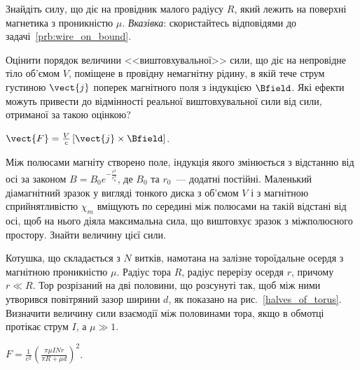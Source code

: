 \begin{problem}
    Знайдіть силу, що діє на провідник малого радіусу $R$, який лежить на поверхні магнетика з проникністю $\mu$. \emph{Вказівка}: скористайтесь відповідями до задачі~\ref{prb:wire_on_bound}.
\end{problem}

\begin{problem}
    Оцінити порядок величини <<виштовхувальної>> сили, що діє на непровідне тіло об'ємом $V$, поміщене в провідну немагнітну рідину, в якій тече струм густиною $\vect{j}$ поперек магнітного поля з індукцією $\Bfield$. Які ефекти можуть привести до відмінності реальної виштовхувальної сили від сили, отриманої за такою оцінкою?
\begin{solution}
	$\vect{F} = \frac{V}{c} \left[ \vect{j}\times\Bfield\right] $.
\end{solution}
\end{problem}

\begin{problem}
    Між полюсами магніту створено поле, індукція якого змінюється з відстанню від осі за законом  $B=B_0e^{-\frac{r^3}{r_0^3}}$, де $B_0$ та $r_0$~--- додатні постійні. Маленький діамагнітний зразок у вигляді тонкого диска з об'ємом $V$ і з магнітною сприйнятливістю $\chi_m$ вміщують по середині між полюсами на такій відстані від осі, щоб на нього діяла максимальна сила, що виштовхує зразок з міжполюсного простору. Знайти величину цієї сили.
\end{problem}

\begin{problem}\label{prb:halves_of_torus}
    Котушка, що складається з $N$ витків, намотана на залізне тороїдальне осердя з магнітною проникністю $\mu$. Радіус тора $R$, радіус перерізу осердя $r$, причому $r \ll R$. Тор розрізаний на дві половини, що розсунуті так, щоб між ними утворився повітряний зазор ширини $d$, як показано на рис.~\ref{halves_of_torus}. Визначити величину сили взаємодії між половинами тора, якщо в обмотці протікає струм $I$, а $\mu \gg 1$.
\begin{solution}
	$F = \frac1{c^2}\left( \frac{\pi\mu I N r}{\pi R + \mu d}\right)^2$.
\end{solution}
\end{problem}

